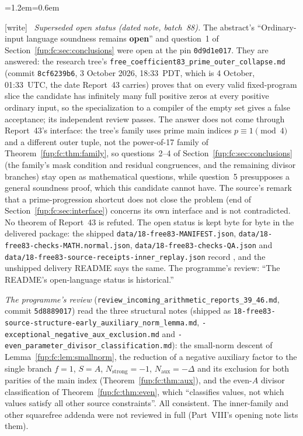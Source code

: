 \documentclass[11pt,letterpaper]{article}
\theoremstyle{definition}\newtheorem{definition}[theorem]{Definition}
\theoremstyle{remark}\newtheorem{remark}[theorem]{Remark}
\newcommand{\code}[1]{\texttt{\detokenize{#1}}}
\newcommand{\Na}{N_{\mathrm{aux}}}\newcommand{\Nk}{N_{\mathrm{index}}}\newcommand{\Nt}{N_{\mathrm{transport}}}
\newcommand{\Ns}{N_{\mathrm{strong}}}
\newcommand{\wtag}{\textup{[write]}}
\newenvironment{writenote}{\par\smallskip\begin{list}{}{\leftmargin=1.2em\rightmargin=0.6em}\item[]\small\wtag\ }{\end{list}\smallskip}
\newcommand{\rw}[1]{\nolinkurl{#1}}%
\begin{document}
\begin{writenote}
\emph{Superseded open status (dated note, batch~88).} The abstract's ``Ordinary-input language soundness remains \textbf{open}'' and question~1 of Section~\ref{fup:fc:sec:conclusions} were open at the pin \texttt{0d9d1e017}. They are answered: the research tree's \rw{free_coefficient83_prime_outer_collapse.md} (commit \texttt{8cf6239b6}, 3 October 2026, 18:33~PDT, which is 4 October, 01:33~UTC, the date Report~43 carries) proves that on every valid fixed-program slice the candidate has infinitely many full positive zeros at every positive ordinary input, so the specialization to a compiler of the empty set gives a false acceptance; its independent review passes. The answer does not come through Report~43's interface: the tree's family uses prime main indices $p\equiv1\pmod4$ and a different outer tuple, not the power-of-17 family of Theorem~\ref{fup:fc:thm:family}, so questions~2--4 of Section~\ref{fup:fc:sec:conclusions} (the family's mask condition and residual congruences, and the remaining divisor branches) stay open as mathematical questions, while question~5 presupposes a general soundness proof, which this candidate cannot have. The source's remark that a prime-progression shortcut does not close the problem (end of Section~\ref{fup:fc:sec:interface}) concerns its own interface and is not contradicted. No theorem of Report~43 is refuted. The open status is kept byte for byte in the delivered package: the shipped \rw{data/18-free83-MANIFEST.json}, \rw{data/18-free83-checks-MATH.normal.json}, \rw{data/18-free83-checks-QA.json} and \rw{data/18-free83-source-receipts-inner_replay.json} record \code{"ordinary_input_language": "OPEN"}, and the unshipped delivery README says the same. The programme's review: ``The README's open-language status is historical.''

\emph{The programme's review} (\rw{review_incoming_arithmetic_reports_39_46.md}, commit \texttt{5d8889017}) read the three structural notes (shipped as \rw{18-free83-source-structure-early_auxiliary_norm_lemma.md}, \rw{-exceptional_negative_aux_exclusion.md} and \rw{-even_parameter_divisor_classification.md}): the small-norm descent of Lemma~\ref{fup:fc:lem:smallnorm}, the reduction of a negative auxiliary factor to the single branch $f=1$, $S=A$, $\Ns=-1$, $\Na=-\Delta$ and its exclusion for both parities of the main index (Theorem~\ref{fup:fc:thm:aux}), and the even-$A$ divisor classification of Theorem~\ref{fup:fc:thm:even}, which ``classifies values, not which values satisfy all other source constraints''. All consistent. The inner-family and other squarefree addenda were not reviewed in full (Part~VIII's opening note lists them).


\end{writenote}
\end{document}
